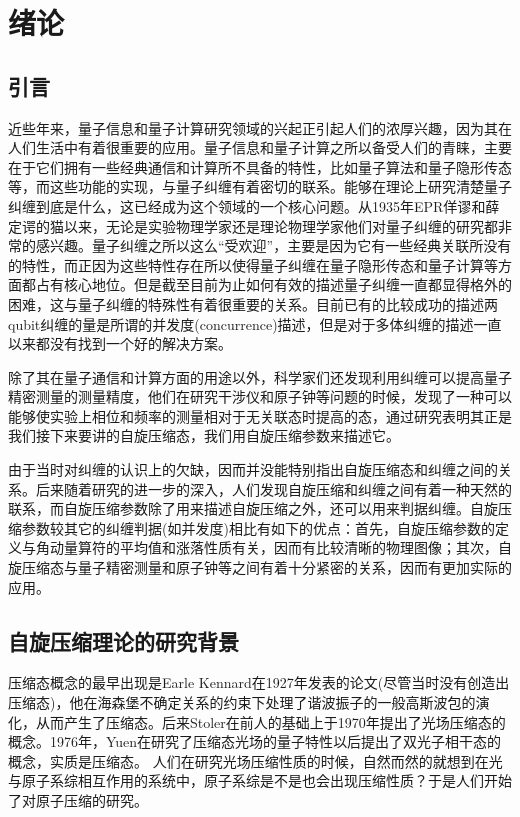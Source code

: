 
\chapter{绪论}\label{chapter1}
\vbox{}\vbox{}
\section{引言}\label{section11}
\vbox{}
近些年来，量子信息\cite{bennett1993teleporting,bennett1992communication,bennett1984proceedings,beige2001secure}和量子计算\cite{shor1994proc,nielsen2002quantum,ekert1996quantum}研究领域的兴起正引起人们的浓厚兴趣，因为其在人们生活中有着很重要的应用。量子信息和量子计算之所以备受人们的青睐，主要在于它们拥有一些经典通信和计算所不具备的特性，比如量子算法和量子隐形传态等\cite{bennett1992communication}，而这些功能的实现，与量子纠缠有着密切的联系。能够在理论上研究清楚量子纠缠到底是什么，这已经成为这个领域的一个核心问题。从1935年EPR佯谬\cite{einstein1935can}和薛定谔的猫以来\cite{article1935}，无论是实验物理学家还是理论物理学家他们对量子纠缠的研究都非常的感兴趣。量子纠缠之所以这么“受欢迎”，主要是因为它有一些经典关联所没有的特性，而正因为这些特性存在所以使得量子纠缠在量子隐形传态和量子计算等方面都占有核心地位。但是截至目前为止如何有效的描述量子纠缠一直都显得格外的困难，这与量子纠缠的特殊性有着很重要的关系。目前已有的比较成功的描述两qubit纠缠的量是所谓的并发度(concurrence)\cite{article1997,PhysRevA.68.012101}描述，但是对于多体纠缠的描述一直以来都没有找到一个好的解决方案。

除了其在量子通信和计算方面的用途以外，科学家们还发现利用纠缠可以提高量子精密测量的测量精度，他们在研究干涉仪和原子钟等问题的时候，发现了一种可以能够使实验上相位和频率的测量相对于无关联态时提高的态，通过研究表明其正是我们接下来要讲的自旋压缩态，我们用自旋压缩参数来描述它。

由于当时对纠缠的认识上的欠缺，因而并没能特别指出自旋压缩态和纠缠之间的关系。后来随着研究的进一步的深入，人们发现自旋压缩和纠缠之间有着一种天然的联系，而自旋压缩参数除了用来描述自旋压缩之外，还可以用来判据纠缠。自旋压缩参数较其它的纠缠判据(如并发度)相比有如下的优点：首先，自旋压缩参数的定义与角动量算符的平均值和涨落性质有关，因而有比较清晰的物理图像；其次，自旋压缩态与量子精密测量和原子钟等之间有着十分紧密的关系，因而有更加实际的应用。

\vbox{}
\section{自旋压缩理论的研究背景}\label{section12}
\vbox{}
压缩态概念的最早出现是Earle Kennard在1927年发表的论文\cite{Kennard1927}(尽管当时没有创造出压缩态)，他在海森堡不确定关系的约束下处理了谐波振子的一般高斯波包的演化，从而产生了压缩态。后来Stoler在前人的基础上于1970年提出了光场压缩态的概念\cite{stoler1970equivalence}。1976年，Yuen在研究了压缩态光场的量子特性\cite{yuen1976two}以后提出了双光子相干态的概念，实质是压缩态。
人们在研究光场压缩性质的时候，自然而然的就想到在光与原子系综相互作用的系统中，原子系综是不是也会出现压缩性质？于是人们开始了对原子压缩的研究。

